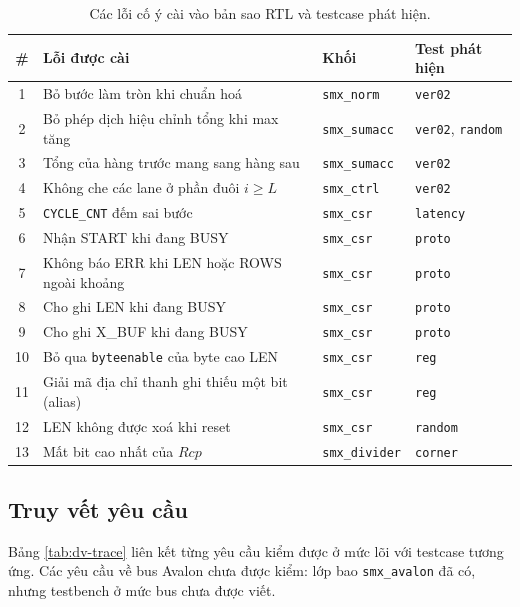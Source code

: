 \begin{table}[htbp]
\centering
\small
\begin{tabular}{cp{8.2cm}ll}
\toprule
\# & Lỗi được cài & Khối & Test phát hiện \\
\midrule
1  & Bỏ bước làm tròn khi chuẩn hoá & \texttt{smx\_norm}   & \texttt{ver02} \\
2  & Bỏ phép dịch hiệu chỉnh tổng khi max tăng & \texttt{smx\_sumacc} & \texttt{ver02}, \texttt{random} \\
3  & Tổng của hàng trước mang sang hàng sau & \texttt{smx\_sumacc} & \texttt{ver02} \\
4  & Không che các lane ở phần đuôi $i \ge L$ & \texttt{smx\_ctrl}   & \texttt{ver02} \\
5  & \texttt{CYCLE\_CNT} đếm sai bước & \texttt{smx\_csr}    & \texttt{latency} \\
6  & Nhận START khi đang BUSY & \texttt{smx\_csr}    & \texttt{proto} \\
7  & Không báo ERR khi LEN hoặc ROWS ngoài khoảng & \texttt{smx\_csr}    & \texttt{proto} \\
8  & Cho ghi LEN khi đang BUSY & \texttt{smx\_csr}    & \texttt{proto} \\
9  & Cho ghi X\_BUF khi đang BUSY & \texttt{smx\_csr}    & \texttt{proto} \\
10 & Bỏ qua \texttt{byteenable} của byte cao LEN & \texttt{smx\_csr}    & \texttt{reg} \\
11 & Giải mã địa chỉ thanh ghi thiếu một bit (alias) & \texttt{smx\_csr}    & \texttt{reg} \\
12 & LEN không được xoá khi reset & \texttt{smx\_csr}    & \texttt{random} \\
13 & Mất bit cao nhất của $\mathit{Rcp}$ & \texttt{smx\_divider} & \texttt{corner} \\
\bottomrule
\end{tabular}
\caption{Các lỗi cố ý cài vào bản sao RTL và testcase phát hiện.}
\label{tab:dv-mutation}
\end{table}

\subsection{Truy vết yêu cầu}

Bảng \ref{tab:dv-trace} liên kết từng yêu cầu kiểm được ở mức lõi với testcase tương ứng. Các yêu cầu về bus Avalon chưa được kiểm: lớp bao \texttt{smx\_avalon} đã có, nhưng testbench ở mức bus chưa được viết.

